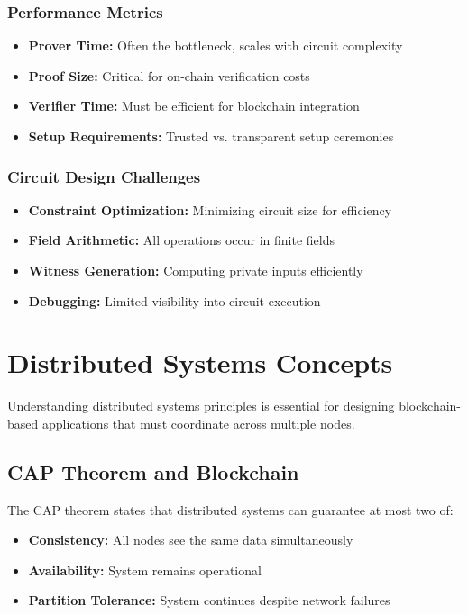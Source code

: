 \subsubsection{Performance Metrics}
\begin{itemize}
    \item \textbf{Prover Time:} Often the bottleneck, scales with circuit complexity
    \item \textbf{Proof Size:} Critical for on-chain verification costs
    \item \textbf{Verifier Time:} Must be efficient for blockchain integration
    \item \textbf{Setup Requirements:} Trusted vs. transparent setup ceremonies
\end{itemize}

\subsubsection{Circuit Design Challenges}
\begin{itemize}
    \item \textbf{Constraint Optimization:} Minimizing circuit size for efficiency
    \item \textbf{Field Arithmetic:} All operations occur in finite fields
    \item \textbf{Witness Generation:} Computing private inputs efficiently
    \item \textbf{Debugging:} Limited visibility into circuit execution
\end{itemize}

\section{Distributed Systems Concepts}

Understanding distributed systems principles is essential for designing blockchain-based applications that must coordinate across multiple nodes.

\subsection{CAP Theorem and Blockchain}

The CAP theorem states that distributed systems can guarantee at most two of:
\begin{itemize}
    \item \textbf{Consistency:} All nodes see the same data simultaneously
    \item \textbf{Availability:} System remains operational
    \item \textbf{Partition Tolerance:} System continues despite network failures
\end{itemize}

